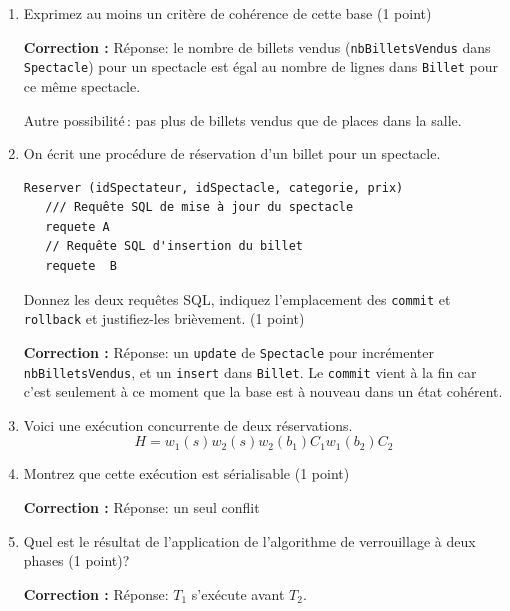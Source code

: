 \documentclass[10pt]{article}
\newenvironment{solution}{\vspace{6pt}\noindent\color{red}\textbf{Correction : }}{\vspace{6pt}\ignorespacesafterend}
\begin{document}
\begin{enumerate}

\item Exprimez au moins un critère de cohérence de cette base (1 point)
 

\begin{solution}
Réponse: le nombre de billets vendus (\texttt{nbBilletsVendus} dans \texttt{Spectacle}) pour un spectacle est égal au nombre
de lignes dans \texttt{Billet} pour ce même spectacle.

Autre possibilité\,: pas plus de billets vendus que de places dans la salle.
\end{solution}

\item On écrit une procédure de réservation d'un billet pour un spectacle.

\begin{verbatim}
Reserver (idSpectateur, idSpectacle, categorie, prix)
   /// Requête SQL de mise à jour du spectacle
   requete A
   // Requête SQL d'insertion du billet
   requete  B
\end{verbatim}

Donnez les deux requêtes SQL, indiquez l'emplacement des \texttt{commit} et \texttt{rollback} 
et justifiez-les brièvement.  (1 point)

\begin{solution}
Réponse:  un \texttt{update} de \texttt{Spectacle} pour incrémenter \texttt{nbBilletsVendus},
et un \texttt{insert} dans \texttt{Billet}. Le \texttt{commit} vient à la fin car c'est seulement à ce moment
que la base est à nouveau dans un état cohérent. 
\end{solution}

\item Voici une exécution concurrente de deux réservations.
$$H=w_1(s)w_2(s)w_2(b_1)C_1w_1(b_2)C_2$$

    \item Montrez que cette exécution est sérialisable (1 point)
    
\begin{solution}
Réponse: un seul conflit
\end{solution}

    \item Quel est le résultat de l'application de l'algorithme de verrouillage à deux phases (1 point)?
    
\begin{solution}
Réponse: $T_1$ s'exécute avant $T_2$.
\end{solution}

\end{enumerate}
\end{document}
